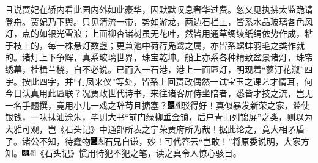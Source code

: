 且说贾妃在轿内看此园内外如此豪华，因默默叹息奢华过费。忽又见执拂太监跪请登舟。贾妃乃下舆。只见清流一带，势如游龙，两边石栏上，皆系水晶玻璃各色风灯，点的如银光雪浪；上面柳杏诸树虽无花叶，然皆用通草绸绫纸绢依势作成，粘于枝上的，每一株悬灯数盏；更兼池中荷荇凫鹭之属，亦皆系螺蚌羽毛之类作就的。诸灯上下争辉，真系玻璃世界，珠宝乾坤。船上亦系各种精致盆景诸灯，珠帘绣幕，桂楫兰桡，自不必说。已而入一石港，港上一面匾灯，明现着``蓼汀花溆''四字。按此四字，并``有凤来仪''等处，皆系上回贾政偶然一试宝玉之课艺才情耳，何今日认真用此匾联？况贾政世代诗书，来往诸客屏侍坐陪者，悉皆才技之流，岂无一名手题撰，竟用小儿一戏之辞苟且搪塞？{\includegraphics[width=3mm]{../Images/00004}\includegraphics[width=3mm]{../Images/00010}\footnotesize \kaishu 驳得好！}真似暴发新荣之家，滥使银钱，一味抹油涂朱，毕则大书``前门绿柳垂金锁，后户青山列锦屏''之类，则以为大雅可观，岂《石头记》中通部所表之宁荣贾府所为哉！据此论之，竟大相矛盾了。诸公不知，待蠢物{\includegraphics[width=3mm]{../Images/00003}\includegraphics[width=3mm]{../Images/00012}\footnotesize \kaishu 石兄自谦，妙！可代答云``岂敢！''}将原委说明，大家方知。{\includegraphics[width=3mm]{../Images/00004}\includegraphics[width=3mm]{../Images/00010}\footnotesize \kaishu 《石头记》惯用特犯不犯之笔，读之真令人惊心骇目。}

